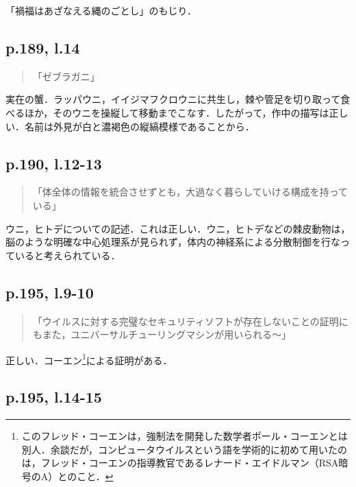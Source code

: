 \documentclass[10pt, a5paper, twoside]{ltjsarticle}
\begin{document}
            「禍福はあざなえる縄のごとし」のもじり．

        \subsection{p.189, l.14}

            \begin{quote}
                「ゼブラガニ」
            \end{quote}

            実在の蟹．ラッパウニ，イイジマフクロウニに共生し，棘や管足を切り取って食べるほか，そのウニを操縦して移動までこなす．したがって，作中の描写は正しい．名前は外見が白と濃褐色の縦縞模様であることから．

        \subsection{p.190, l.12-13}

            \begin{quote}
                「体全体の情報を統合させずとも，大過なく暮らしていける構成を持っている」
            \end{quote}

            ウニ，ヒトデについての記述．これは正しい．ウニ，ヒトデなどの棘皮動物は，脳のような明確な中心処理系が見られず，体内の神経系による分散制御を行なっていると考えられている\cite{takahashi}．

        \subsection{p.195, l.9-10}

            \begin{quote}
                「ウイルスに対する完璧なセキュリティソフトが存在しないことの証明にもまた，ユニバーサルチューリングマシンが用いられる〜」
            \end{quote}

            正しい．コーエン\footnote{このフレッド・コーエンは，強制法を開発した数学者ポール・コーエンとは別人．余談だが，コンピュータウイルスという語を学術的に初めて用いたのは，フレッド・コーエンの指導教官であるレナード・エイドルマン（RSA暗号のA）とのこと\cite{cohen}．}による証明\cite{cohen}がある．

        \subsection{p.195, l.14-15}
\end{document}
